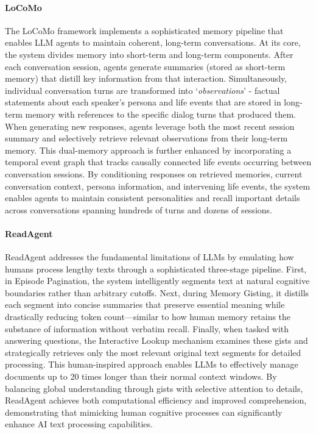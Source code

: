 \paragraph{LoCoMo} The LoCoMo framework implements a sophisticated memory pipeline that enables LLM agents to maintain coherent, long-term conversations. At its core, the system divides memory into short-term and long-term components. After each conversation session, agents generate summaries (stored as short-term memory) that distill key information from that interaction. Simultaneously, individual conversation turns are transformed into `\textit{observations}' - factual statements about each speaker's persona and life events that are stored in long-term memory with references to the specific dialog turns that produced them. When generating new responses, agents leverage both the most recent session summary and selectively retrieve relevant observations from their long-term memory. This dual-memory approach is further enhanced by incorporating a temporal event graph that tracks causally connected life events occurring between conversation sessions. By conditioning responses on retrieved memories, current conversation context, persona information, and intervening life events, the system enables agents to maintain consistent personalities and recall important details across conversations spanning hundreds of turns and dozens of sessions.

\paragraph{ReadAgent} ReadAgent addresses the fundamental limitations of LLMs by emulating how humans process lengthy texts through a sophisticated three-stage pipeline. First, in Episode Pagination, the system intelligently segments text at natural cognitive boundaries rather than arbitrary cutoffs. Next, during Memory Gisting, it distills each segment into concise summaries that preserve essential meaning while drastically reducing token count—similar to how human memory retains the substance of information without verbatim recall. Finally, when tasked with answering questions, the Interactive Lookup mechanism examines these gists and strategically retrieves only the most relevant original text segments for detailed processing. This human-inspired approach enables LLMs to effectively manage documents up to 20 times longer than their normal context windows. By balancing global understanding through gists with selective attention to details, ReadAgent achieves both computational efficiency and improved comprehension, demonstrating that mimicking human cognitive processes can significantly enhance AI text processing capabilities.

